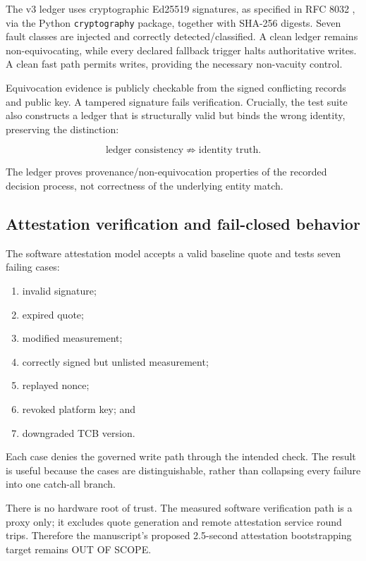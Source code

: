 \documentclass[11pt]{article}
\newcommand{\code}[1]{\texttt{#1}}
\begin{document}
The v3 ledger uses cryptographic Ed25519 signatures, as specified in RFC 8032 \cite{rfc8032}, via the Python \code{cryptography} package, together with SHA-256 digests. Seven fault classes are injected and correctly detected/classified. A clean ledger remains non-equivocating, while every declared fallback trigger halts authoritative writes. A clean fast path permits writes, providing the necessary non-vacuity control.

Equivocation evidence is publicly checkable from the signed conflicting records and public key. A tampered signature fails verification. Crucially, the test suite also constructs a ledger that is structurally valid but binds the wrong identity, preserving the distinction:

\[
\text{ledger consistency} \not\Rightarrow \text{identity truth}.
\]

The ledger proves provenance/non-equivocation properties of the recorded decision process, not correctness of the underlying entity match.

\subsection{Attestation verification and fail-closed behavior}

The software attestation model accepts a valid baseline quote and tests seven failing cases:

\begin{enumerate}
  \item invalid signature;
  \item expired quote;
  \item modified measurement;
  \item correctly signed but unlisted measurement;
  \item replayed nonce;
  \item revoked platform key; and
  \item downgraded TCB version.
\end{enumerate}

Each case denies the governed write path through the intended check. The result is useful because the cases are distinguishable, rather than collapsing every failure into one catch-all branch.

There is no hardware root of trust. The measured software verification path is a proxy only; it excludes quote generation and remote attestation service round trips. Therefore the manuscript's proposed 2.5-second attestation bootstrapping target remains OUT OF SCOPE.
\end{document}
